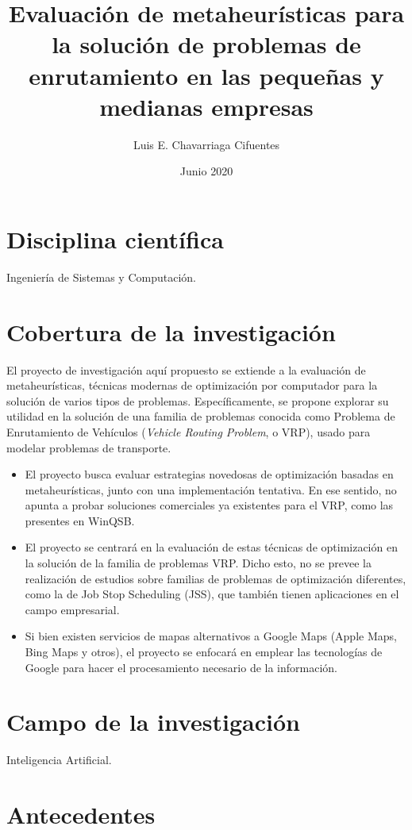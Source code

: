 \message{ !name(proposal.tex)}\documentclass[12pt]{extarticle}
\title{Evaluación de metaheurísticas para la solución de problemas de
  enrutamiento en las pequeñas y medianas empresas}
\author{Luis E. Chavarriaga Cifuentes}
\date{Junio 2020}
\begin{document}


\maketitle

\section{Disciplina científica}
Ingeniería de Sistemas y Computación.

\section{Cobertura de la investigación}
El proyecto de investigación aquí propuesto se extiende a la evaluación de
metaheurísticas, técnicas modernas de optimización por computador para la
solución de varios tipos de problemas. Específicamente, se propone explorar su
utilidad en la solución de una familia de problemas conocida como Problema de
Enrutamiento de Vehículos (\textit{Vehicle Routing Problem}, o VRP), usado para
modelar problemas de transporte.

\begin{itemize}
\item El proyecto busca evaluar estrategias novedosas de optimización basadas en
  metaheurísticas, junto con una implementación tentativa. En ese sentido, no
  apunta a probar soluciones comerciales ya existentes para el VRP, como las
  presentes en WinQSB.
\item El proyecto se centrará en la evaluación de estas técnicas de optimización
  en la solución de la familia de problemas VRP. Dicho esto, no se prevee la
  realización de estudios sobre familias de problemas de optimización
  diferentes, como la de Job Stop Scheduling (JSS), que también tienen
  aplicaciones en el campo empresarial.
\item Si bien existen servicios de mapas alternativos a Google Maps (Apple Maps,
  Bing Maps y otros), el proyecto se enfocará en emplear las tecnologías de
  Google para hacer el procesamiento necesario de la información.
\end{itemize}

\section{Campo de la investigación}
Inteligencia Artificial.

\section{Antecedentes}
\end{document}
